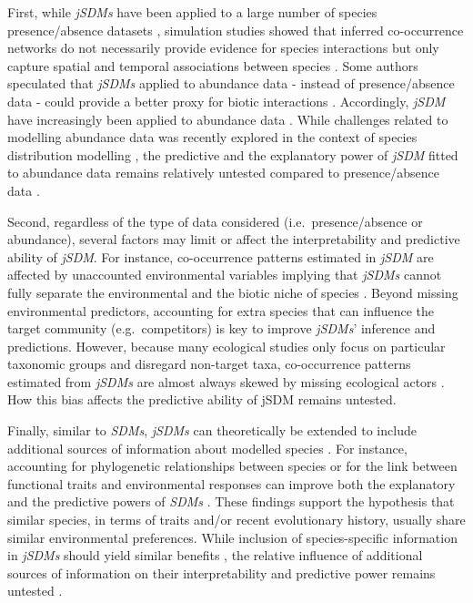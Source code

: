 \documentclass[9pt,biorxiv,doublespacing,lineno]{lapreprint}
\begin{document}
First, while \emph{jSDMs} have been applied to a large number of species
presence/absence datasets \autocites[ ]{Norberg_2019}[
]{Wilkinson_2019}{Wilkinson_2020}, simulation studies showed that
inferred co-occurrence networks do not necessarily provide evidence for
species interactions \autocites[ ]{Dormann_2018}{Blanchet_2020} but only
capture spatial and temporal associations between species
\autocite{Keil_2021}. Some authors speculated that \emph{jSDMs} applied
to abundance data - instead of presence/absence data - could provide a
better proxy for biotic interactions \autocites[
]{Blanchet_2020}{Momal_2020}. Accordingly, \emph{jSDM} have increasingly
been applied to abundance data \autocites[ ]{Hui_2016}[
]{Ovaskainen_2017a}{Chiquet_2021}. While challenges related to modelling
abundance data was recently explored in the context of species
distribution modelling \autocite{Waldock_2022}, the predictive and the
explanatory power of \emph{jSDM} fitted to abundance data remains
relatively untested compared to presence/absence data \autocites[
]{Norberg_2019}{Wilkinson_2020}.

Second, regardless of the type of data considered (i.e.~presence/absence
or abundance), several factors may limit or affect the interpretability
and predictive ability of \emph{jSDM}. For instance, co-occurrence
patterns estimated in \emph{jSDM} are affected by unaccounted
environmental variables implying that \emph{jSDMs} cannot fully separate
the environmental and the biotic niche of species \autocites[
]{Blanchet_2020}{Poggiato_2021}. Beyond missing environmental
predictors, accounting for extra species that can influence the target
community (e.g.~competitors) is key to improve \emph{jSDMs}' inference
and predictions. However, because many ecological studies only focus on
particular taxonomic groups \autocites[ ]{Pollock_2014}{Hakkila_2018}
and disregard non-target taxa, co-occurrence patterns estimated from
\emph{jSDMs} are almost always skewed by missing ecological actors
\autocite{Momal_2021}. How this bias affects the predictive ability of
jSDM remains untested.

Finally, similar to \emph{SDMs}, \emph{jSDMs} can theoretically be
extended to include additional sources of information about modelled
species \autocites[ ]{Niku_2019}{Ovaskainen_2017a}. For instance,
accounting for phylogenetic relationships between species
\autocite{Ives_2011} or for the link between functional traits and
environmental responses \autocite{Pollock_2012} can improve both the
explanatory and the predictive powers of \emph{SDMs} \autocites[
]{Morales-Castilla_2017}{Vesk_2021}. These findings support the
hypothesis that similar species, in terms of traits and/or recent
evolutionary history, usually share similar environmental preferences.
While inclusion of species-specific information in \emph{jSDMs} should
yield similar benefits \autocite{Ovaskainen_2017a}, the relative
influence of additional sources of information on their interpretability
and predictive power remains untested \autocites[ ]{Norberg_2019}[
]{Wilkinson_2019}{Abrego_2022}.
\end{document}
